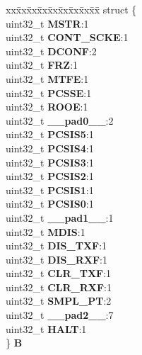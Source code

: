 \begin{DoxyCompactItemize}
\begin{tabbing}
\end{tabbing}\item 
\mbox{\label{unionDSPI__tag_1_1DSPI__MCR__tag_a802f5f5f4c42acbd5aac4e04a762d590}} 
\begin{tabbing}
xx\=xx\=xx\=xx\=xx\=xx\=xx\=xx\=xx\=\kill
struct \{\\
\>uint32\_t {\bfseries MSTR}:1\\
\>uint32\_t {\bfseries CONT\_SCKE}:1\\
\>uint32\_t {\bfseries DCONF}:2\\
\>uint32\_t {\bfseries FRZ}:1\\
\>uint32\_t {\bfseries MTFE}:1\\
\>uint32\_t {\bfseries PCSSE}:1\\
\>uint32\_t {\bfseries ROOE}:1\\
\>uint32\_t {\bfseries \_\_pad0\_\_}:2\\
\>uint32\_t {\bfseries PCSIS5}:1\\
\>uint32\_t {\bfseries PCSIS4}:1\\
\>uint32\_t {\bfseries PCSIS3}:1\\
\>uint32\_t {\bfseries PCSIS2}:1\\
\>uint32\_t {\bfseries PCSIS1}:1\\
\>uint32\_t {\bfseries PCSIS0}:1\\
\>uint32\_t {\bfseries \_\_pad1\_\_}:1\\
\>uint32\_t {\bfseries MDIS}:1\\
\>uint32\_t {\bfseries DIS\_TXF}:1\\
\>uint32\_t {\bfseries DIS\_RXF}:1\\
\>uint32\_t {\bfseries CLR\_TXF}:1\\
\>uint32\_t {\bfseries CLR\_RXF}:1\\
\>uint32\_t {\bfseries SMPL\_PT}:2\\
\>uint32\_t {\bfseries \_\_pad2\_\_}:7\\
\>uint32\_t {\bfseries HALT}:1\\
\} {\bfseries B}\\


\end{tabbing}
\end{DoxyCompactItemize}
